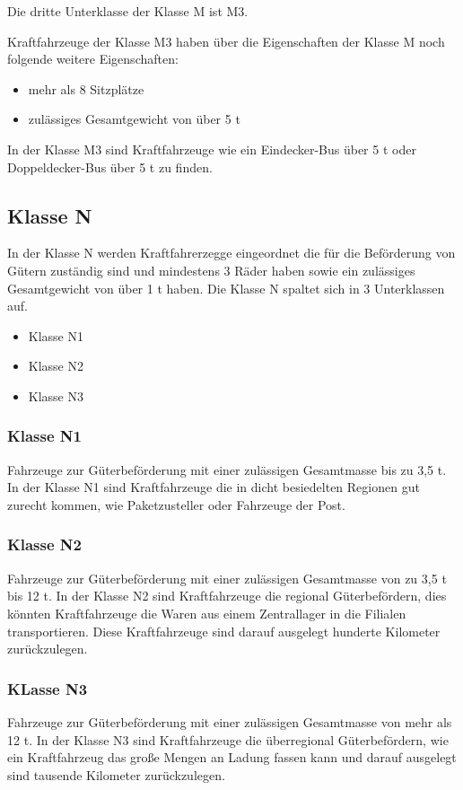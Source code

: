 Die dritte Unterklasse der Klasse M ist M3.

Kraftfahrzeuge der Klasse M3 haben über die Eigenschaften der Klasse M noch folgende weitere Eigenschaften:
\begin{itemize}
	\item {mehr als 8 Sitzplätze}
	\item {zulässiges Gesamtgewicht von über 5 \ac{t}}
\end{itemize}

In der Klasse M3 sind Kraftfahrzeuge wie ein Eindecker-Bus über 5 \ac{t} oder Doppeldecker-Bus über 5 \ac{t} zu finden.

\subsection{Klasse N}
In der Klasse N werden Kraftfahrerzegge eingeordnet die für die Beförderung von Gütern zuständig sind und mindestens 3 Räder haben sowie ein zulässiges Gesamtgewicht von über 1 \ac{t} haben.
Die Klasse N spaltet sich in 3 Unterklassen auf.
\begin{itemize}
	\item {Klasse N1}
	\item {Klasse N2}
	\item {Klasse N3}
\end{itemize}

\subsubsection{Klasse N1}
Fahrzeuge zur Güterbeförderung mit einer zulässigen Gesamtmasse bis zu 3,5 \ac{t}.
In der Klasse N1 sind Kraftfahrzeuge die in dicht besiedelten Regionen gut zurecht kommen, wie Paketzusteller oder Fahrzeuge der Post.


\subsubsection{Klasse N2}
Fahrzeuge zur Güterbeförderung mit einer zulässigen Gesamtmasse von zu 3,5 \ac{t} bis 12 \ac*{t}.
In der Klasse N2 sind Kraftfahrzeuge die regional Güterbefördern, dies könnten Kraftfahrzeuge die Waren aus einem Zentrallager in die Filialen transportieren. 
Diese Kraftfahrzeuge sind darauf ausgelegt hunderte Kilometer zurückzulegen.


\subsubsection{KLasse N3}
Fahrzeuge zur Güterbeförderung mit einer zulässigen Gesamtmasse von mehr als 12 \ac{t}.
In der Klasse N3 sind Kraftfahrzeuge die überregional Güterbefördern, wie ein Kraftfahrzeug das große Mengen an Ladung fassen kann und darauf ausgelegt sind tausende Kilometer zurückzulegen.

